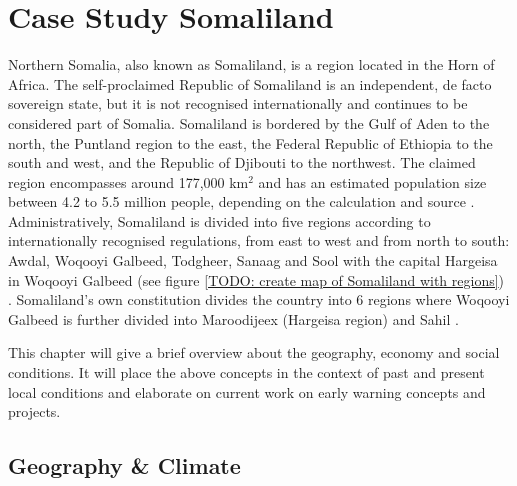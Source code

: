 


\section{Case Study Somaliland}\label{sec:case_area} 

Northern Somalia, also known as Somaliland, is a region located in the Horn of Africa. The self-proclaimed Republic of Somaliland is an independent, de facto sovereign state, but it is not recognised internationally and continues to be considered part of Somalia. Somaliland is bordered by the Gulf of Aden to the north, the Puntland region to the east, the Federal Republic of Ethiopia to the south and west, and the Republic of Djibouti to the northwest. The claimed region encompasses around 177,000 km$^2$ and has an estimated population size between 4.2 to 5.5 million people, depending on the calculation and source \autocite{petrucciLandscapeLandformsNorthern2022,republicofsomaliaCountryProfile20212021,scrsFeasibilityStudyPotential2022}. Administratively, Somaliland is divided into five regions according to internationally recognised regulations, from east to west and from north to south: Awdal, Woqooyi Galbeed, Todgheer, Sanaag and Sool with the capital Hargeisa in Woqooyi Galbeed (see figure \ref{TODO: create map of Somaliland with regions}) \autocite{republicofsomaliaCountryProfile20212021}. Somaliland's own constitution divides the country into 6 regions where Woqooyi Galbeed is further divided into Maroodijeex (Hargeisa region) and Sahil \autocite{republicofsomalilandRegionsDistrictsSelfmanagement2019}.


This chapter will give a brief overview about the geography, economy and social conditions. It will place the above concepts in the context of past and present local conditions and elaborate on current work on early warning concepts and projects. 


\subsection{Geography \& Climate}

